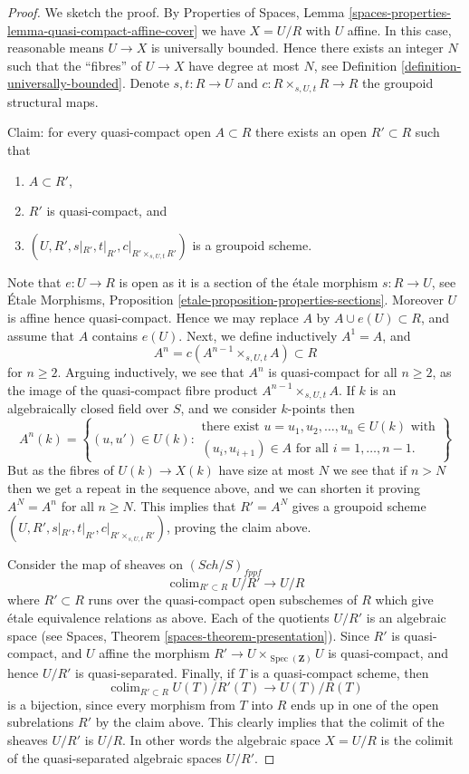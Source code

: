 \documentclass{stacks-project}
\theoremstyle{plain}
\theoremstyle{definition}
\theoremstyle{remark}
\numberwithin{equation}{subsection}
\def\colim{\mathop{\mathrm{colim}}\nolimits}
\def\Spec{\mathop{\mathrm{Spec}}}
\def\Sch{\mathit{Sch}}
\begin{document}
\begin{proof}
We sketch the proof. By
Properties of Spaces, Lemma
\ref{spaces-properties-lemma-quasi-compact-affine-cover}
we have $X = U/R$ with $U$ affine.
In this case, reasonable means $U \to X$ is universally bounded.
Hence there exists an integer $N$ such that the ``fibres'' of $U \to X$
have degree at most $N$, see
Definition \ref{definition-universally-bounded}.
Denote $s, t : R \to U$ and $c : R \times_{s, U, t} R \to R$ the
groupoid structural maps.

\medskip\noindent
Claim: for every quasi-compact open $A \subset R$ there exists
an open $R' \subset R$ such that
\begin{enumerate}
\item $A \subset R'$,
\item $R'$ is quasi-compact, and
\item $(U, R', s|_{R'}, t|_{R'}, c|_{R' \times_{s, U, t} R'})$ is
a groupoid scheme.
\end{enumerate}
Note that $e : U \to R$ is open as it is a section of the \'etale morphism
$s : R \to U$, see
\'Etale Morphisms, Proposition \ref{etale-proposition-properties-sections}.
Moreover $U$ is affine hence quasi-compact. Hence we may replace $A$ by
$A \cup e(U) \subset R$, and assume that $A$ contains $e(U)$. Next, we
define inductively $A^1 = A$, and
$$
A^n = c(A^{n - 1} \times_{s, U, t} A) \subset R
$$
for $n \geq 2$. Arguing inductively, we see that $A^n$ is quasi-compact for
all $n \geq 2$, as the image of the quasi-compact fibre product
$A^{n - 1} \times_{s, U, t} A$. If $k$ is an algebraically
closed field over $S$, and we consider $k$-points then
$$
A^n(k) = \left\{(u, u') \in U(k)
:
\begin{matrix}
\text{there exist } u = u_1, u_2, \ldots, u_n \in U(k)\text{ with} \\
(u_i , u_{i + 1}) \in A \text{ for all }i = 1, \ldots, n - 1.
\end{matrix}
\right\}
$$
But as the fibres of $U(k) \to X(k)$ have size at most $N$ we see that if
$n > N$ then we get a repeat in the sequence above, and we can shorten it
proving $A^N = A^n$ for all $n \geq N$.
This implies that $R' = A^N$ gives a groupoid scheme
$(U, R', s|_{R'}, t|_{R'}, c|_{R' \times_{s, U, t} R'})$, proving the claim
above.

\medskip\noindent
Consider the map of sheaves on $(\Sch/S)_{fppf}$
$$
\colim_{R' \subset R} U/R' \longrightarrow U/R
$$
where $R' \subset R$ runs over the quasi-compact open subschemes
of $R$ which give \'etale equivalence relations as above. Each of the
quotients $U/R'$ is an algebraic space
(see Spaces, Theorem \ref{spaces-theorem-presentation}).
Since $R'$ is quasi-compact, and $U$ affine the morphism
$R' \to U \times_{\Spec(\mathbf{Z})} U$ is quasi-compact,
and hence $U/R'$ is quasi-separated. Finally, if $T$ is a quasi-compact
scheme, then
$$
\colim_{R' \subset R} U(T)/R'(T) \longrightarrow U(T)/R(T)
$$
is a bijection, since every morphism from $T$ into $R$ ends up in one
of the open subrelations $R'$ by the claim above. This clearly implies
that the colimit of the sheaves $U/R'$ is $U/R$. In other words
the algebraic space $X = U/R$ is the colimit of the quasi-separated
algebraic spaces $U/R'$.


\end{proof}
\end{document}
